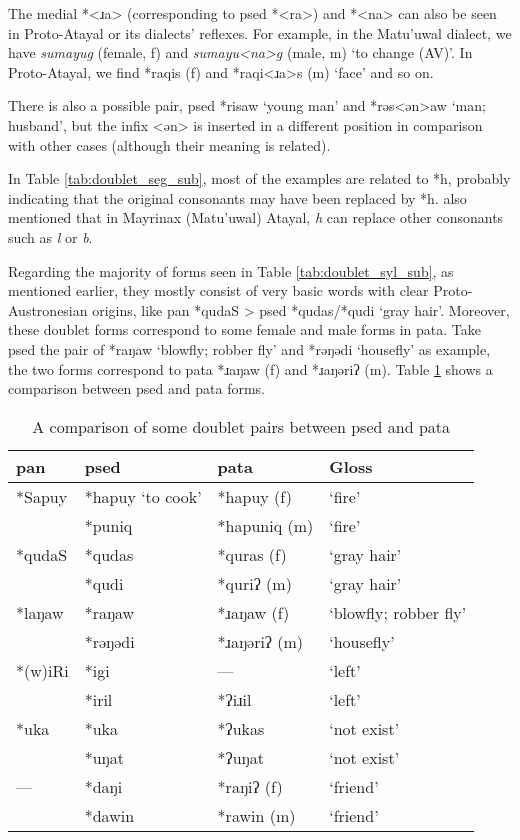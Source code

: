 The medial *<ɹa> (corresponding to \acl{psed} *<ra>) and *<na> can also be seen in Proto-Atayal or its dialects' reflexes. For example, in the Matu'uwal dialect, we have \textit{sumayug} (female, f) and \textit{sumayu<na>g} (male, m) `to change (AV)'.  In Proto-Atayal, we find *raqis (f) and *raqi<ɹa>s (m) `face' and so on. 

There is also a possible pair, \acl{psed} *risaw `young man' and *rəs<ən>aw `man; husband', but the infix <ən> is inserted in a different position in comparison with other cases (although their meaning is related).

In Table \ref{tab:doublet_seg_sub}, most of the examples are related to *h, probably indicating that the original consonants may have been replaced by *h. \textcite{li1983gender} also mentioned that in Mayrinax (Matu'uwal) Atayal, \textit{h} can replace other consonants such as \textit{l} or \textit{b}.

Regarding the majority of forms seen in Table \ref{tab:doublet_syl_sub}, as mentioned earlier, they mostly consist of very basic words with clear Proto-Austronesian origins, like \acs{pan} *qudaS > \acs{psed} *qudas/*qudi `gray hair'. Moreover, these doublet forms correspond to some female and male forms in \acl{pata}. Take \acl{psed} the pair of *raŋaw `blowfly; robber fly' and *rəŋədi `housefly' as example, the two forms correspond to \acl{pata} *ɹaŋaw (f) and *ɹaŋəriʔ (m).  Table \ref{tab:ata_sed_grs_compare} shows a comparison between \acl{psed} and \acl{pata} forms.

\begin{table}[!htbp]
\centering
\caption{A comparison of some doublet pairs between \acl{psed} and \acl{pata}}
\label{tab:ata_sed_grs_compare}
\begin{tabular}{llll}
\hline
\acs{pan}   & \acl{psed}  & \acl{pata}       & Gloss                 \\ \hline
*Sapuy & *hapuy `to cook' & *hapuy (f)  & `fire'        \\
       & *puniq  & *hapuniq (m) & `fire'                \\
*qudaS & *qudas  & *quras (f)   & `gray hair'           \\
       & *qudi   & *quriʔ (m)   & `gray hair'           \\
*laŋaw & *raŋaw  & *ɹaŋaw (f)   & `blowfly; robber fly' \\
       & *rəŋədi & *ɹaŋəriʔ (m) & `housefly'            \\
*(w)iRi& *igi    & ---          & `left'                \\
       & *iril   & *ʔiɹil       & `left'                \\
*uka   & *uka    & *ʔukas       & `not exist'           \\
       & *uŋat   & *ʔuŋat       & `not exist'           \\ 
---    & *daŋi   & *raŋiʔ (f)   & `friend'              \\
       & *dawin  & *rawin (m)   & `friend'              \\ \hline
\end{tabular}
\end{table}

